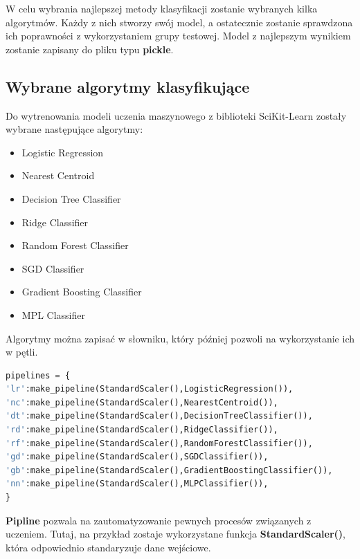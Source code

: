 \quad W celu wybrania najlepszej metody klasyfikacji zostanie wybranych kilka algorytmów. Każdy z nich stworzy swój model, a ostatecznie zostanie sprawdzona ich poprawności z wykorzystaniem grupy testowej. Model z najlepszym wynikiem zostanie zapisany do pliku typu \textbf{pickle}.

\subsection{Wybrane algorytmy klasyfikujące}

\quad Do wytrenowania modeli uczenia maszynowego z biblioteki SciKit-Learn \cite{bib:ml} zostały wybrane następujące algorytmy:

\begin{itemize}
    \item Logistic Regression %
    \item Nearest Centroid 
    \item Decision Tree Classifier
    \item Ridge Classifier 
    \item Random Forest Classifier 
    \item SGD Classifier
    \item Gradient Boosting Classifier
    \item MPL Classifier
\end{itemize}

\quad Algorytmy można zapisać w słowniku, który później pozwoli na wykorzystanie ich w pętli. \newline

\begin{lstlisting}[language=python, style=programming, captionpos=b, caption={Funkcja zwracająca rozpoznany gest}]
pipelines = {
'lr':make_pipeline(StandardScaler(),LogisticRegression()),
'nc':make_pipeline(StandardScaler(),NearestCentroid()),
'dt':make_pipeline(StandardScaler(),DecisionTreeClassifier()),
'rd':make_pipeline(StandardScaler(),RidgeClassifier()),
'rf':make_pipeline(StandardScaler(),RandomForestClassifier()),
'gd':make_pipeline(StandardScaler(),SGDClassifier()),
'gb':make_pipeline(StandardScaler(),GradientBoostingClassifier()),
'nn':make_pipeline(StandardScaler(),MLPClassifier()),
}
\end{lstlisting}

\quad \textbf{Pipline} pozwala na zautomatyzowanie pewnych procesów związanych z uczeniem. Tutaj, na przykład zostaje wykorzystane funkcja \textbf{StandardScaler()}, która odpowiednio standaryzuje dane wejściowe. 

